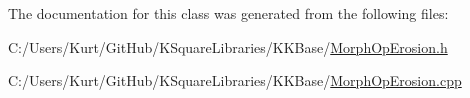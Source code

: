 The documentation for this class was generated from the following files\+:\begin{DoxyCompactItemize}
\item 
C\+:/\+Users/\+Kurt/\+Git\+Hub/\+K\+Square\+Libraries/\+K\+K\+Base/\hyperlink{_morph_op_erosion_8h}{Morph\+Op\+Erosion.\+h}\item 
C\+:/\+Users/\+Kurt/\+Git\+Hub/\+K\+Square\+Libraries/\+K\+K\+Base/\hyperlink{_morph_op_erosion_8cpp}{Morph\+Op\+Erosion.\+cpp}\end{DoxyCompactItemize}
